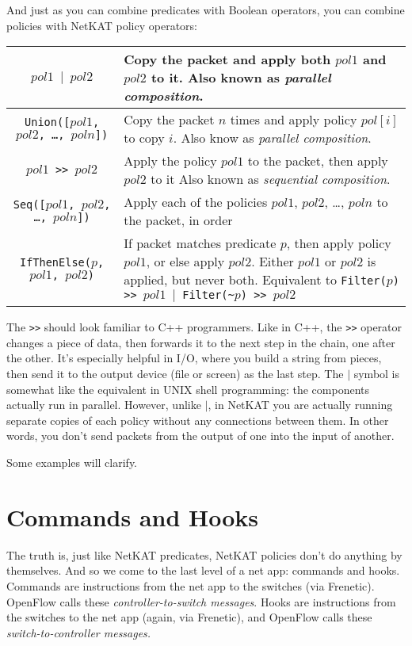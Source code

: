 And just as you can combine predicates with Boolean operators, you can combine policies with NetKAT 
policy operators:

\bigskip
\begin{tabularx}{6in}{|c|X|}
\hline\hline
\texttt{$pol1$ $\vert$ $pol2$} & Copy the packet and apply both $pol1$ and $pol2$ to it.   
Also known as \textit{parallel composition}.
\\ \hline  
\texttt{Union([$pol1$, $pol2$, \ldots, $poln$])} & 
Copy the packet $n$ times and apply policy $pol[i]$ to copy $i$.
Also know as \textit{parallel composition}.  
\\ \hline  
\texttt{$pol1$ >> $pol2$} & Apply the policy $pol1$ to the packet, then apply $pol2$ to it
Also known as \textit{sequential composition}.
\\ \hline  
\texttt{Seq([$pol1$, $pol2$, \ldots, $poln$])} & 
Apply each of the policies $pol1$, $pol2$, \ldots, $poln$ to the packet, in order 
\\ \hline  
\texttt{IfThenElse($p$, $pol1$, $pol2$)} & If packet matches predicate $p$, then apply policy $pol1$, or else
apply $pol2$.  
Either $pol1$ or $pol2$ is applied, but never both.
Equivalent to \texttt{Filter($p$) >> $pol1$ $\vert$ Filter(\textasciitilde$p$) >> $pol2$}
\\ \hline\hline
\end{tabularx}

\bigskip

The \texttt{>>} should look familiar to C++ programmers. 
Like in C++, the \texttt{>>} operator changes a piece of data, then forwards it to the next step in the chain, one
after the other.
It's especially helpful in I/O, where you build a string from pieces, then send it to the output device (file or screen) as the
last step.
The $\vert$ symbol is somewhat like the equivalent in UNIX shell programming: the components actually run in parallel.
However, unlike $\vert$, in NetKAT you are actually running separate copies of each policy without any connections
between them.
In other words, you don't send packets from the output of one into the input of another.

Some examples will clarify.

\section{Commands and Hooks}

The truth is, just like NetKAT predicates, NetKAT policies don't do anything by themselves.
And so we come to the last level of a net app: commands and hooks.
Commands are instructions from the net app to the switches (via Frenetic).  
OpenFlow calls these \emph{controller-to-switch messages}.  
Hooks are instructions from the switches to the net app (again, via Frenetic), and OpenFlow
calls these \emph{switch-to-controller messages.}

